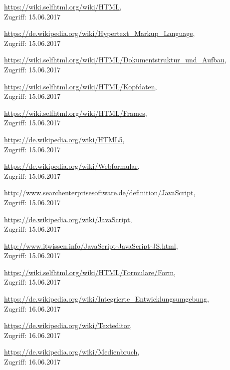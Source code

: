 \documentclass[12pt,a4paper,bibliography=totocnumbered,listof=totocnumbered]{scrartcl}
\begin{document}
\begin{thebibliography}{999}


\url{https://wiki.selfhtml.org/wiki/HTML}, \\
Zugriff: 15.06.2017

\url{https://de.wikipedia.org/wiki/Hypertext\_Markup\_Language},\\
Zugriff: 15.06.2017

\url{https://wiki.selfhtml.org/wiki/HTML/Dokumentstruktur\_und\_Aufbau}, \\
Zugriff: 15.06.2017

\url{https://wiki.selfhtml.org/wiki/HTML/Kopfdaten}, \\
Zugriff: 15.06.2017

\url{https://wiki.selfhtml.org/wiki/HTML/Frames}, \\
Zugriff: 15.06.2017

\url{https://de.wikipedia.org/wiki/HTML5}, \\
Zugriff: 15.06.2017

\url{https://de.wikipedia.org/wiki/Webformular}, \\
Zugriff: 15.06.2017

\url{http://www.searchenterprisesoftware.de/definition/JavaScript}, \\
Zugriff: 15.06.2017

\url{https://de.wikipedia.org/wiki/JavaScript}, \\
Zugriff: 15.06.2017

\url{http://www.itwissen.info/JavaScript-JavaScript-JS.html}, \\
Zugriff: 15.06.2017

\url{https://wiki.selfhtml.org/wiki/HTML/Formulare/Form}, \\
Zugriff: 15.06.2017

\url{https://de.wikipedia.org/wiki/Integrierte_Entwicklungsumgebung}, \\
Zugriff: 16.06.2017

\url{https://de.wikipedia.org/wiki/Texteditor}, \\
Zugriff: 16.06.2017

\url{https://de.wikipedia.org/wiki/Medienbruch}, \\
Zugriff: 16.06.2017





\end{thebibliography}
\end{document}
